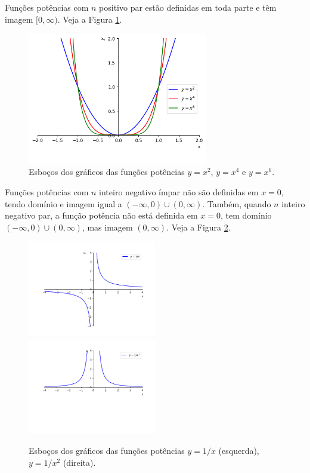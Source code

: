 Funções potências com $n$ positivo par estão definidas em toda parte e têm imagem $[0, \infty)$. Veja a Figura \ref{fig:funpot_par}.

\begin{figure}[H]
  \centering
  \includegraphics[width=0.7\textwidth]{./cap_funcao/dados/fig_funpot_par/fig_funpot_par}
  \caption{Esboços dos gráficos das funções potências $y=x^2$, $y=x^4$ e $y=x^6$.}
  \label{fig:funpot_par}
\end{figure}

Funções potências com $n$ inteiro negativo ímpar não são definidas em $x=0$, tendo domínio e imagem igual a $(-\infty, 0)\cup (0, \infty)$. Também, quando $n$ inteiro negativo par, a função potência não está definida em $x=0$, tem domínio $(-\infty, 0)\cup (0, \infty)$, mas imagem $(0, \infty)$. Veja a Figura \ref{fig:funpot_negativo}.

\begin{figure}[H]
  \centering
  \includegraphics[width=0.5\textwidth]{./cap_funcao/dados/fig_funpot_negativo/fig_funpot_negativo_impar}~
    \includegraphics[width=0.5\textwidth]{./cap_funcao/dados/fig_funpot_negativo/fig_funpot_negativo_par}
  \caption{Esboços dos gráficos das funções potências $y=1/x$ (esquerda), $y=1/x^2$ (direita).}
  \label{fig:funpot_negativo}
\end{figure}

